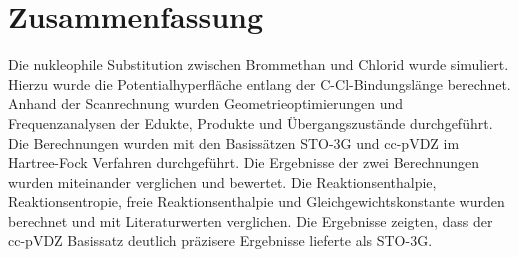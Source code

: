 \newpage

\section{Zusammenfassung}

Die nukleophile Substitution zwischen Brommethan und Chlorid wurde simuliert.
Hierzu wurde die Potentialhyperfläche entlang der C-Cl-Bindungslänge berechnet.
Anhand der Scanrechnung wurden Geometrieoptimierungen und Frequenzanalysen der Edukte, Produkte und Übergangszustände durchgeführt.
Die Berechnungen wurden mit den Basissätzen STO-3G und cc-pVDZ im Hartree-Fock Verfahren durchgeführt.
Die Ergebnisse der zwei Berechnungen wurden miteinander verglichen und bewertet.
Die Reaktionsenthalpie, Reaktionsentropie, freie Reaktionsenthalpie und Gleichgewichtskonstante wurden berechnet und mit Literaturwerten verglichen.
Die Ergebnisse zeigten, dass der cc-pVDZ Basissatz deutlich präzisere Ergebnisse lieferte als STO-3G.

\newpage
\printbibliography
